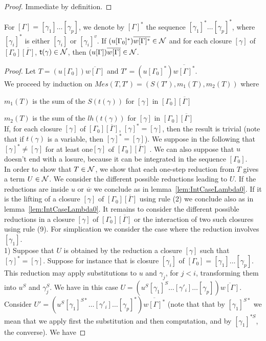 \documentclass{llncs} %
\begin{document}
\begin{proof}
Immediate by definition.
\end{proof}

\begin{lemma}\label{lem:IntCaseSharing0}
For $[\Gamma] = [\gamma_1] \dots[\gamma_p]$, we denote by $[\Gamma]^*$ the sequence $[\gamma_1]^* \dots[\gamma_p]^*$, where $[\gamma_i]^*$ is either $[\gamma_i]$ or $[\gamma_i]^v$.
 If $(u[\Gamma_0]^*)\overline{w[\Gamma]^*} \in \mathcal{N}$ and for each closure $[\gamma]$ of $[\Gamma_0]\overline{[\Gamma]}$,  ${\mathsf{t}} (\gamma)\in\mathcal{N}$, then $(u[\Gamma])\overline{w[\Gamma]} \in \mathcal{N}$.
\end{lemma}

\begin{proof}
 
  Let $T = (u[\Gamma_0])\overline{w[\Gamma]}$ and $T' = (u[\Gamma_0]^*)\overline{w[\Gamma]^*}$.
\\
We proceed by induction on $Mes(T,T') = (S(T'), m_1(T), m_2(T))$ where

 $m_1(T)$ is the sum of the $S(t(\gamma))$ for  $[\gamma]$ in $[\Gamma_0]\overline{[\Gamma]}$

 $m_2(T)$ is the sum of the $lh(t(\gamma))$ for $[\gamma]$ in $[\Gamma_0]\overline{[\Gamma]}$
 \\
If,  for each closure $[\gamma]$ of $[\Gamma_0]\overline{[\Gamma]}$,  $[\gamma]^* = [\gamma]$, then the result is trivial (note that if $t(\gamma)$ is a variable, then  $[\gamma]^* = [\gamma]$). We suppose in the following that $[\gamma]^* \neq [\gamma]$ for at least one$[\gamma]$ of $[\Gamma_0]\overline{[\Gamma]}$ . We can also suppose that $u$ doesn't end with a losure, because it can be integrated in the sequence $[\Gamma_0]$.
\\
In order to show that $T\in\mathcal{N}$, we show that each one-step reduction from $T$ gives a term $U\in\mathcal{N}$. We consider the different possible reductions leading to $U$. If the reductions are inside $u$ or $\overline{w}$ we conclude as in lemma~\ref{lem:IntCaseLambda0}. If it is the lifting of a closure $[\gamma]$ of $[\Gamma_0]\overline{[\Gamma]}$ using rule (2) we conclude also as in lemma~\ref{lem:IntCaseLambda0}. It remains to consider the different possible reductions in a closure $[\gamma]$ of $[\Gamma_0]\overline{[\Gamma]}$ or the interaction of two such closures using rule (9). For simplication we consider the case where the reduction involves $[\gamma_1]$. 
%
%
\medskip
\\
1) Suppose that $U$ is obtained by the reduction a closure $[\gamma]$ such that  $[\gamma]^* = [\gamma]$. Suppose for instance that is closure $[\gamma_i]$ of $[\Gamma_0] = [\gamma_1] \dots[\gamma_p]$. This reduction  may apply substitutions to $u$ and $\gamma_j$, for $j<i$, transforming them into $u^S$ and $\gamma_j^S$. We have in this case $U = (u^S[\gamma_1]^S \dots [\gamma'_i]\dots [\gamma_p])\overline{w[\Gamma]}$. 
\\
Consider $U' = (u^S[\gamma_1]^{S*} \dots [\gamma'_i]\dots [\gamma_p]^*)\overline{w[\Gamma]^*}$ (note that that by $[\gamma_1]^{S*}$ we mean that we apply first the substitution and then computation, and by $[\gamma_1]^{*S}$, the converse).  We have


\end{proof}
\end{document}
